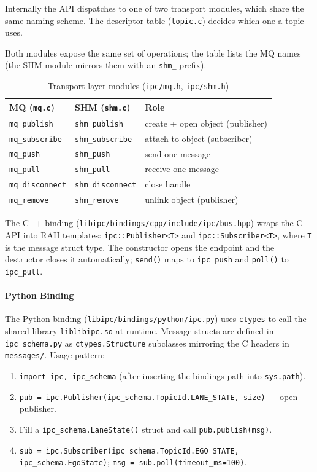 \documentclass[12pt,a4paper]{article}
\begin{document}
Internally the API dispatches to one of two transport modules, which share the
same naming scheme. The descriptor table (\texttt{topic.c}) decides which one a
topic uses.

Both modules expose the same set of operations; the table lists the MQ names
(the SHM module mirrors them with an \texttt{shm\_} prefix).

\begin{table}[H]
\centering
\begin{tabular}{lll}
\hline
\textbf{MQ (\texttt{mq.c})} & \textbf{SHM (\texttt{shm.c})} & \textbf{Role} \\
\hline
\texttt{mq\_publish}    & \texttt{shm\_publish}    & create + open object (publisher) \\
\texttt{mq\_subscribe}  & \texttt{shm\_subscribe}  & attach to object (subscriber) \\
\texttt{mq\_push}       & \texttt{shm\_push}       & send one message \\
\texttt{mq\_pull}       & \texttt{shm\_pull}       & receive one message \\
\texttt{mq\_disconnect} & \texttt{shm\_disconnect} & close handle \\
\texttt{mq\_remove}     & \texttt{shm\_remove}     & unlink object (publisher) \\
\hline
\end{tabular}
\caption{Transport-layer modules (\texttt{ipc/mq.h}, \texttt{ipc/shm.h})}
\end{table}

The C++ binding (\texttt{libipc/bindings/cpp/include/ipc/bus.hpp}) wraps the C API
into RAII templates: \texttt{ipc::Publisher<T>} and \texttt{ipc::Subscriber<T>},
where \texttt{T} is the message struct type. The constructor opens the endpoint
and the destructor closes it automatically; \texttt{send()} maps to
\texttt{ipc\_push} and \texttt{poll()} to \texttt{ipc\_pull}.

\paragraph{Python Binding}

The Python binding (\texttt{libipc/bindings/python/ipc.py}) uses \texttt{ctypes} to call the shared library
\texttt{liblibipc.so} at runtime. Message structs are defined in \texttt{ipc\_schema.py} as
\texttt{ctypes.Structure} subclasses mirroring the C headers in \texttt{messages/}.
Usage pattern:
\begin{enumerate}
  \item \texttt{import ipc, ipc\_schema} (after inserting the bindings path into \texttt{sys.path}).
  \item \texttt{pub = ipc.Publisher(ipc\_schema.TopicId.LANE\_STATE, size)} --- open publisher.
  \item Fill a \texttt{ipc\_schema.LaneState()} struct and call \texttt{pub.publish(msg)}.
  \item \texttt{sub = ipc.Subscriber(ipc\_schema.TopicId.EGO\_STATE, ipc\_schema.EgoState)};
        \texttt{msg = sub.poll(timeout\_ms=100)}.
\end{enumerate}
\end{document}
